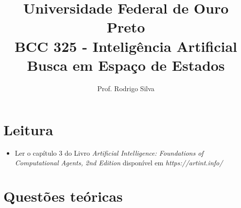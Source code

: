 \documentclass{article}
\title{\vspace{-2 cm}Universidade Federal de Ouro Preto \\ BCC 325 - Inteligência Artificial \\ Busca em Espaço de Estados}
\author{Prof. Rodrigo Silva}
\date{}
\begin{document}
\maketitle

\section{Leitura}

\begin{itemize}
    \item Ler o capítulo 3 do Livro\textit{ Artificial Intelligence: Foundations of Computational Agents,  2nd Edition} disponível em \textit{https://artint.info/}
\end{itemize}

\section{Questões teóricas}
\end{document}
